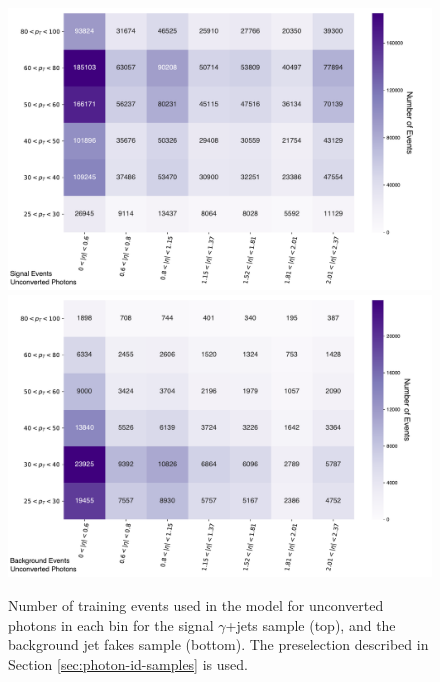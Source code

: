 \begin{figure}[!hp]
    \centering
    \includegraphics[width=.85\textwidth]{chapters/chapter4_photonID/images/sig_events.pdf}
    \includegraphics[width=.85\textwidth]{chapters/chapter4_photonID/images/bkg_events.pdf}
    \caption[Number of training events used in the model for unconverted photons in each \etaPt bin for the signal $\gamma$+jets sample, and the background jet fakes sample]{Number of training events used in the model for unconverted photons in each \etaPt bin for the signal $\gamma$+jets sample (top), and the background jet fakes sample (bottom). The preselection described in Section \ref{sec:photon-id-samples} is used.}
    \label{fig:photonid-events}
\end{figure}

